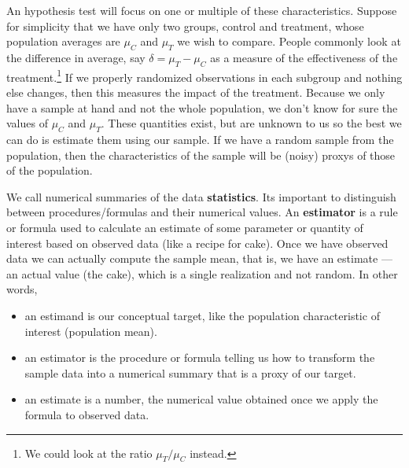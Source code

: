 \documentclass[
  11pt,
  letterpaper,
]{scrbook}
\providecommand{\tightlist}{%
  \setlength{\itemsep}{0pt}\setlength{\parskip}{0pt}}\usepackage{longtable,booktabs,array}
\theoremstyle{definition}
\theoremstyle{definition}
\theoremstyle{remark}
\begin{document}
An hypothesis test will focus on one or multiple of these
characteristics. Suppose for simplicity that we have only two groups,
control and treatment, whose population averages are \(\mu_C\) and
\(\mu_T\) we wish to compare. People commonly look at the difference in
average, say \(\delta=\mu_T - \mu_C\) as a measure of the effectiveness
of the treatment.\footnote{We could look at the ratio \(\mu_T/\mu_C\)
  instead.} If we properly randomized observations in each subgroup and
nothing else changes, then this measures the impact of the treatment.
Because we only have a sample at hand and not the whole population, we
don't know for sure the values of \(\mu_C\) and \(\mu_T\). These
quantities exist, but are unknown to us so the best we can do is
estimate them using our sample. If we have a random sample from the
population, then the characteristics of the sample will be (noisy)
proxys of those of the population.

We call numerical summaries of the data \textbf{statistics}. Its
important to distinguish between procedures/formulas and their numerical
values. An \textbf{estimator} is a rule or formula used to calculate an
estimate of some parameter or quantity of interest based on observed
data (like a recipe for cake). Once we have observed data we can
actually compute the sample mean, that is, we have an estimate --- an
actual value (the cake), which is a single realization and not random.
In other words,

\begin{itemize}
\tightlist
\item
  an estimand is our conceptual target, like the population
  characteristic of interest (population mean).
\item
  an estimator is the procedure or formula telling us how to transform
  the sample data into a numerical summary that is a proxy of our
  target.
\item
  an estimate is a number, the numerical value obtained once we apply
  the formula to observed data.
\end{itemize}
\end{document}

